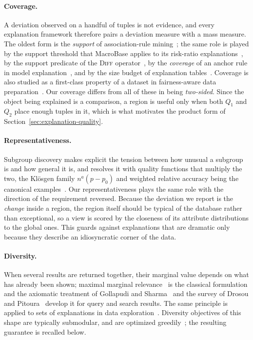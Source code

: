 \paragraph{Coverage.}
A deviation observed on a handful of tuples is not evidence, and every explanation
framework therefore pairs a deviation measure with a mass measure.
The oldest form is the \emph{support} of association-rule
mining~\cite{AgrawalIS93}; the same role is played by the support threshold that
MacroBase applies to its risk-ratio explanations~\cite{MacroBase}, by the support
predicate of the \textsc{Diff} operator~\cite{DIFF}, by the \emph{coverage} of an
anchor rule in model explanation~\cite{Anchors}, and by the size budget of
explanation tables~\cite{ExplanationTables}.
Coverage is also studied as a first-class property of a dataset in fairness-aware
data preparation~\cite{AsudehJJ19}.
Our coverage differs from all of these in being \emph{two-sided}.
Since the object being explained is a comparison, a region is useful only when both $Q_1$ and $Q_2$
place enough tuples in it, which is what motivates the product form of
Section~\ref{sec:explanation-quality}.

\paragraph{Representativeness.}
Subgroup discovery makes explicit the tension between how unusual a subgroup is and
how general it is, and resolves it with quality functions that multiply the two,
the Klösgen family $n^{a}(p-p_0)$ and weighted relative accuracy being the canonical
examples~\cite{Wrobel97,HerreraCGJ11}.
Our representativeness plays the same role with the direction of the requirement
reversed.
Because the deviation we report is the \emph{change} inside a region, the
region itself should be typical of the database rather than exceptional, so a view
is scored by the closeness of its attribute distributions to the global ones.
This guards against explanations that are dramatic only because they describe an
idiosyncratic corner of the data.

\paragraph{Diversity.}
When several results are returned together, their marginal value depends on what has
already been shown; maximal marginal relevance~\cite{MMR} is the classical
formulation and the axiomatic treatment of Gollapudi and Sharma~\cite{GollapudiS09}
and the survey of Drosou and Pitoura~\cite{DrosouP10} develop it for query and
search results.
The same principle is applied to sets of explanations in data
exploration~\cite{FEDEX,ICDE23}.
Diversity objectives of this shape are typically submodular, and are optimized
greedily~\cite{LinBilmes11}; the resulting guarantee is recalled below.

